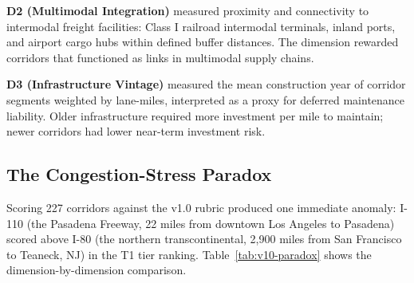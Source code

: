 \textbf{D2 (Multimodal Integration)} measured proximity and connectivity to intermodal freight facilities: Class I railroad intermodal terminals, inland ports, and airport cargo hubs within defined buffer distances. The dimension rewarded corridors that functioned as links in multimodal supply chains.

\textbf{D3 (Infrastructure Vintage)} measured the mean construction year of corridor segments weighted by lane-miles, interpreted as a proxy for deferred maintenance liability. Older infrastructure required more investment per mile to maintain; newer corridors had lower near-term investment risk.

\subsection{The Congestion-Stress Paradox}

Scoring 227 corridors against the v1.0 rubric produced one immediate anomaly: I-110 (the Pasadena Freeway, 22 miles from downtown Los Angeles to Pasadena) scored above I-80 (the northern transcontinental, 2,900 miles from San Francisco to Teaneck, NJ) in the T1 tier ranking. Table~\ref{tab:v10-paradox} shows the dimension-by-dimension comparison.

